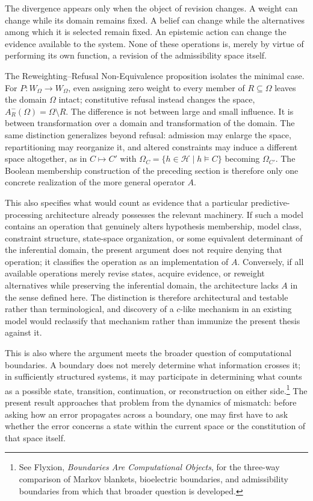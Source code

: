 \documentclass[11pt]{article}
\begin{document}
The divergence appears only when the object of revision changes. A weight can change while its domain remains fixed. A belief can change while the alternatives among which it is selected remain fixed. An epistemic action can change the evidence available to the system. None of these operations is, merely by virtue of performing its own function, a revision of the admissibility space itself.

The Reweighting–Refusal Non-Equivalence proposition isolates the minimal case. For $P : W_\Omega \rightarrow W_\Omega$, even assigning zero weight to every member of $R \subseteq \Omega$ leaves the domain $\Omega$ intact; constitutive refusal instead changes the space, $A_R^-(\Omega) = \Omega \setminus R$. The difference is not between large and small influence. It is between transformation over a domain and transformation of the domain. The same distinction generalizes beyond refusal: admission may enlarge the space, repartitioning may reorganize it, and altered constraints may induce a different space altogether, as in $C \mapsto C'$ with $\Omega_C = \{h \in \mathcal{H} \mid h \models C\}$ becoming $\Omega_{C'}$. The Boolean membership construction of the preceding section is therefore only one concrete realization of the more general operator $A$.

This also specifies what would count as evidence that a particular predictive-processing architecture already possesses the relevant machinery. If such a model contains an operation that genuinely alters hypothesis membership, model class, constraint structure, state-space organization, or some equivalent determinant of the inferential domain, the present argument does not require denying that operation; it classifies the operation as an implementation of $A$. Conversely, if all available operations merely revise states, acquire evidence, or reweight alternatives while preserving the inferential domain, the architecture lacks $A$ in the sense defined here. The distinction is therefore architectural and testable rather than terminological, and discovery of a $c$-like mechanism in an existing model would reclassify that mechanism rather than immunize the present thesis against it.

This is also where the argument meets the broader question of computational boundaries. A boundary does not merely determine what information crosses it; in sufficiently structured systems, it may participate in determining what counts as a possible state, transition, continuation, or reconstruction on either side.\footnote{See Flyxion, \emph{Boundaries Are Computational Objects}, for the three-way comparison of Markov blankets, bioelectric boundaries, and admissibility boundaries from which that broader question is developed.} The present result approaches that problem from the dynamics of mismatch: before asking how an error propagates across a boundary, one may first have to ask whether the error concerns a state within the current space or the constitution of that space itself.
\end{document}
